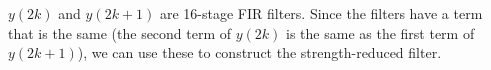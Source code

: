 $y(2k)$ and $y(2k+1)$ are 16-stage FIR filters.
Since the filters have a term that is the same (the second term of $y(2k)$ is the same as the first term of $y(2k+1)$), we can use these to construct the strength-reduced filter.

%	
